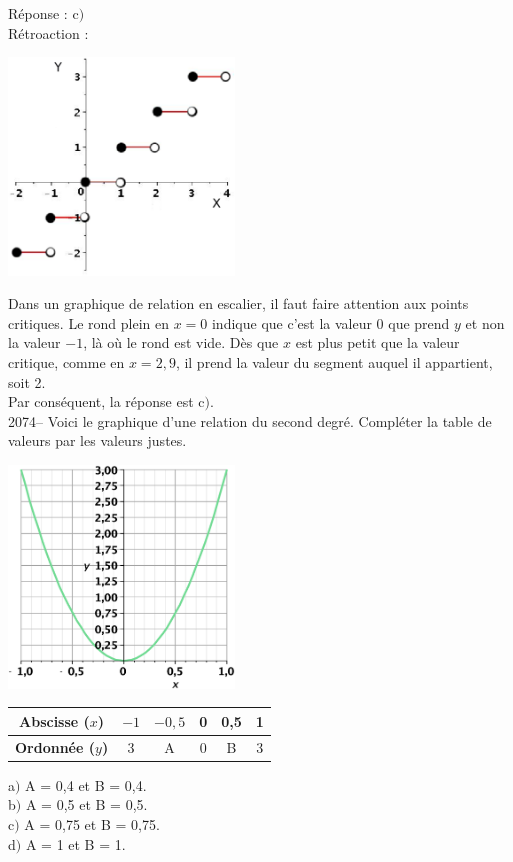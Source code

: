 \documentclass[letterpaper, 12pt]{article}
\begin{document}
R\'eponse : c$)$\\

R\'etroaction :\\
\begin{center}
 \includegraphics[width=6cm]{Q2073.eps}
\end{center}
Dans un graphique de relation en escalier, il faut faire attention aux points critiques. Le rond plein en $x = 0$ indique que c'est la valeur 0 que prend $y$ et non la valeur $-1$, l\`a o\`u le rond est vide. D\`es que $x$ est plus petit que la valeur critique, comme en $x = 2,9$, il prend la valeur du segment auquel il appartient, soit 2.\\
Par cons\'equent, la r\'eponse est c$)$.\\


2074-- Voici le graphique d'une relation du second degr\'e. Compl\'eter la table de valeurs par les valeurs justes.
\begin{center}
 \includegraphics[width=6cm,bb=20 118 575 673]{Q2074v.eps}
\end{center}
\begin{center}
 \begin{tabular}{|c||c| c | c | c | c |} \hline
{\bf Abscisse ($x$)} & $-1$ & $-0,5$ & 0 & 0,5 & 1 \\ \hline
{\bf Ordonn\'ee ($y$)} & 3 & A & 0 & B & 3 \\ \hline
\end{tabular}
\end{center}
a$)$ A = 0,4 et B = 0,4.\\
b$)$ A = 0,5 et B = 0,5.\\
c$)$ A = 0,75 et B = 0,75.\\
d$)$ A = 1 et B = 1.\\
\end{document}
